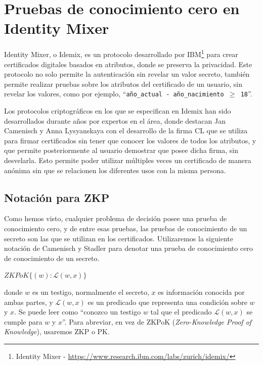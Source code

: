 \hfil



%
%
%
%
%





\section{Pruebas de conocimiento cero en Identity Mixer}

Identity Mixer, o Idemix, es un protocolo desarrollado por IBM\footnote{Identity Mixer - \url{https://www.research.ibm.com/labs/zurich/idemix/}} para crear certificados digitales basados en atributos, donde se preserva la privacidad. Este protocolo no solo permite la autenticación sin revelar un valor secreto, también permite realizar pruebas sobre los atributos del certificado de un usuario, sin revelar los valores, como por ejemplo, ``\texttt{año\_actual - año\_nacimiento $\geq$ 18}''.

Los protocolos criptográficos en los que se especifican en Idemix \citep{idemixSpec} han sido desarrollados durante años por expertos en el área, donde destacan Jan Camenisch y Anna Lysyanskaya con el desarrollo de la firma CL \citep{camenisch2002signature} \citep{camenisch2001efficient} que se utiliza para firmar certificados sin tener que conocer los valores de todos los atributos, y que permite posteriormente al usuario demostrar que posee dicha firma, sin desvelarla. Esto permite poder utilizar múltiples veces un certificado de manera anónima sin que se relacionen los diferentes usos con la misma persona.





\subsection{Notación para ZKP}

Como hemos visto, cualquier problema de decisión posee una prueba de conocimiento cero, y de entre esas pruebas, las pruebas de conocimiento de un secreto son las que se utilizan en los certificados. Utilizaremos la siguiente notación de Camenisch y Stadler \citep{camenisch1997efficient} para denotar una prueba de conocimiento cero de conocimiento de un secreto.

\begin{center}
	$ZKPoK\{ (w) : \mathcal{L}(w,x) \}$
\end{center}
donde $w$ es un testigo, normalmente el secreto, $x$ es información conocida por ambas partes, y $\mathcal{L}(w,x)$ es un predicado que representa una condición sobre $w$ y $x$. Se puede leer como ``conozco un testigo $w$ tal que el predicado $\mathcal{L}(w,x)$ se cumple para $w$ y $x$''. Para abreviar, en vez de ZKPoK (\textit{Zero-Knowledge Proof of Knowledge}), usaremos ZKP o PK.

